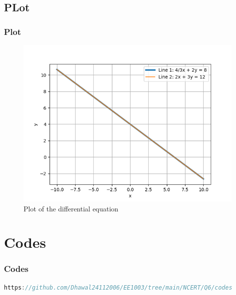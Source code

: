 \documentclass{beamer}
\theoremstyle{remark}
\numberwithin{equation}{section}
\begin{document}
\subsection{PLot}
\begin{frame}[fragile]
\frametitle{Plot}

\begin{figure}[h]
    \centering
    \includegraphics[width=\columnwidth]{figs/Figure_1.png}
    \caption{Plot of the differential equation }
    \label{fig:Plot}
    \end{figure}
\end{frame}

\section{Codes}
\begin{frame}[fragile]
\frametitle{Codes}
\begin{lstlisting}[language=C]
https://github.com/Dhawal24112006/EE1003/tree/main/NCERT/Q6/codes
    \end{lstlisting}
\end{frame}
\end{document}
